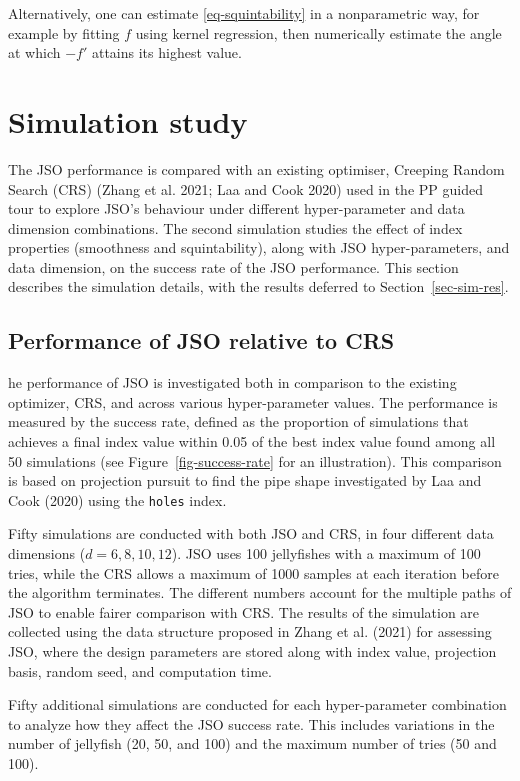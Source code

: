 \documentclass[
  12pt,
]{interact}
\theoremstyle{plain}
\begin{document}
Alternatively, one can estimate \eqref{eq-squintability} in a
nonparametric way, for example by fitting \(f\) using kernel regression,
then numerically estimate the angle at which \(-f'\) attains its highest
value.

\section{Simulation study}\label{sec-sim-deets}

The JSO performance is compared with an existing optimiser, Creeping
Random Search (CRS) (Zhang et al. 2021; Laa and Cook 2020) used in the
PP guided tour to explore JSO's behaviour under different
hyper-parameter and data dimension combinations. The second simulation
studies the effect of index properties (smoothness and squintability),
along with JSO hyper-parameters, and data dimension, on the success rate
of the JSO performance. This section describes the simulation details,
with the results deferred to Section~\ref{sec-sim-res}.

\subsection{Performance of JSO relative to CRS}\label{sec-app-1}

he performance of JSO is investigated both in comparison to the existing
optimizer, CRS, and across various hyper-parameter values. The
performance is measured by the success rate, defined as the proportion
of simulations that achieves a final index value within 0.05 of the best
index value found among all 50 simulations (see
Figure~\ref{fig-success-rate} for an illustration). This comparison is
based on projection pursuit to find the pipe shape investigated by Laa
and Cook (2020) using the \texttt{holes} index.

Fifty simulations are conducted with both JSO and CRS, in four different
data dimensions (\(d = 6, 8, 10, 12\)). JSO uses 100 jellyfishes with a
maximum of 100 tries, while the CRS allows a maximum of 1000 samples at
each iteration before the algorithm terminates. The different numbers
account for the multiple paths of JSO to enable fairer comparison with
CRS. The results of the simulation are collected using the data
structure proposed in Zhang et al. (2021) for assessing JSO, where the
design parameters are stored along with index value, projection basis,
random seed, and computation time.

Fifty additional simulations are conducted for each hyper-parameter
combination to analyze how they affect the JSO success rate. This
includes variations in the number of jellyfish (20, 50, and 100) and the
maximum number of tries (50 and 100).
\end{document}

